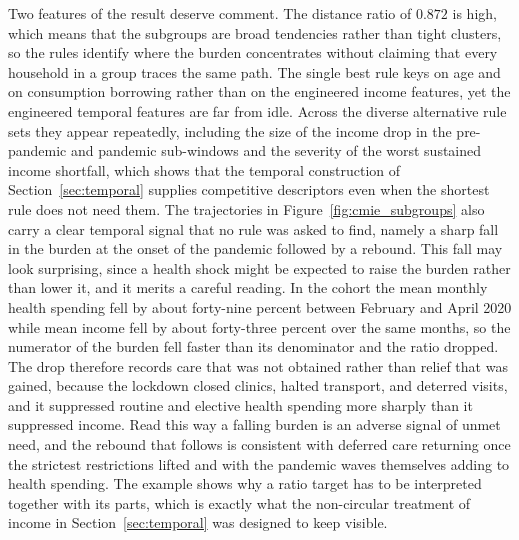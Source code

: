 Two features of the result deserve comment. The distance ratio of $0.872$ is high, which means that the subgroups are broad tendencies rather than tight clusters, so the rules identify where the burden concentrates without claiming that every household in a group traces the same path. The single best rule keys on age and on consumption borrowing rather than on the engineered income features, yet the engineered temporal features are far from idle. Across the diverse alternative rule sets they appear repeatedly, including the size of the income drop in the pre-pandemic and pandemic sub-windows and the severity of the worst sustained income shortfall, which shows that the temporal construction of Section~\ref{sec:temporal} supplies competitive descriptors even when the shortest rule does not need them. The trajectories in Figure~\ref{fig:cmie_subgroups} also carry a clear temporal signal that no rule was asked to find, namely a sharp fall in the burden at the onset of the pandemic followed by a rebound. This fall may look surprising, since a health shock might be expected to raise the burden rather than lower it, and it merits a careful reading. In the cohort the mean monthly health spending fell by about forty-nine percent between February and April 2020 while mean income fell by about forty-three percent over the same months, so the numerator of the burden fell faster than its denominator and the ratio dropped. The drop therefore records care that was not obtained rather than relief that was gained, because the lockdown closed clinics, halted transport, and deterred visits, and it suppressed routine and elective health spending more sharply than it suppressed income. Read this way a falling burden is an adverse signal of unmet need, and the rebound that follows is consistent with deferred care returning once the strictest restrictions lifted and with the pandemic waves themselves adding to health spending. The example shows why a ratio target has to be interpreted together with its parts, which is exactly what the non-circular treatment of income in Section~\ref{sec:temporal} was designed to keep visible.
